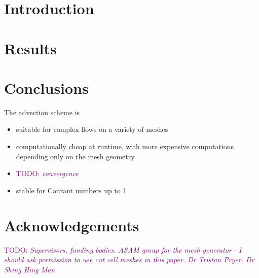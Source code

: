 \documentclass[times]{elsarticle}
\newcommand{\TODO}[1]{\textcolor{purple}{TODO: \emph{#1}}}
\begin{document}
\section{Introduction}




\section{Results}
\label{sec:results}





\section{Conclusions}

The advection scheme is
\begin{itemize}
	\item suitable for complex flows on a variety of meshes
	\item computationally cheap at runtime, with more expensive computations depending only on the mesh geometry
	\item \TODO{convergence}
	\item stable for Courant numbers up to 1
\end{itemize}

\section{Acknowledgements}
\TODO{Supervisors, funding bodies.  ASAM group for the mesh generator---I should ask permission to use cut cell meshes in this paper.  Dr Tristan Pryer.  Dr Shing Hing Man.}







\end{document}
